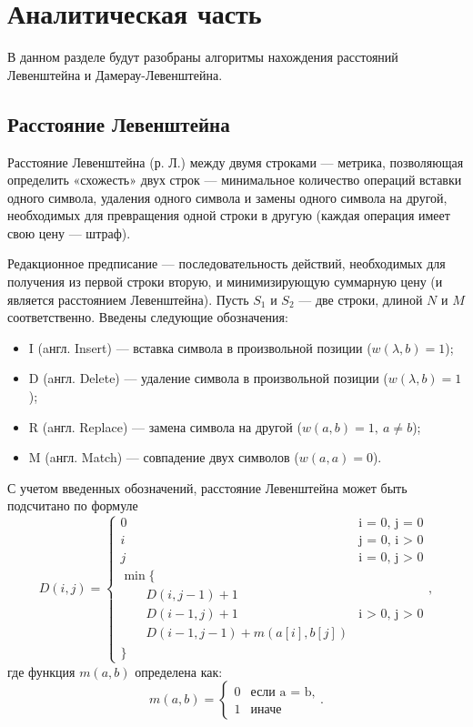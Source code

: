 \chapter{Аналитическая часть}

В данном разделе будут разобраны алгоритмы нахождения расстояний Левенштейна и Дамерау-Левенштейна.

\section{Расстояние Левенштейна}

Расстояние Левенштейна (р. Л.) между двумя строками --- метрика, позволяющая определить «схожесть» двух строк --- минимальное количество операций вставки одного символа, удаления одного символа и замены одного символа на другой, необходимых для превращения одной строки в другую (каждая операция имеет свою цену --- штраф). 

Редакционное предписание --- последовательность действий, необходимых для получения из первой строки вторую, и минимизирующую суммарную цену (и является расстоянием Левенштейна).
Пусть $S_{1}$ и $S_{2}$ --- две строки, длиной $N$ и $M$ соответственно. 
Введены следующие обозначения:
\begin{itemize}
	\item I (aнгл. Insert) --- вставка символа в произвольной позиции ($w(\lambda,b)=1$);
	\item D (aнгл. Delete) --- удаление символа в произвольной позиции ($w(\lambda,b)=1$);
	\item R (aнгл. Replace) --- замена символа на другой ($w(a,b)=1, \medspace a \neq b$);
	\item M (aнгл. Match) --- совпадение двух символов ($w(a,a)=0$).
\end{itemize}
С учетом введенных обозначений, расстояние Левенштейна может быть подсчитано по формуле
\begin{equation}
	\label{eq:D}
	D(i, j) = \begin{cases}
		0 &\text{i = 0, j = 0}\\
		i &\text{j = 0, i > 0}\\
		j &\text{i = 0, j > 0}\\
		\min \lbrace \\
		\qquad D(i, j-1) + 1\\
		\qquad D(i-1, j) + 1 &\text{i > 0, j > 0}\\
		\qquad D(i-1, j-1) + m(a[i], b[j]) \\
		\rbrace
	\end{cases},
\end{equation}
где функция $m(a, b)$ определена как:
\begin{equation}
	\label{eq:m}
	m(a, b) = \begin{cases}
		0 &\text{если a = b,}\\
		1 &\text{иначе}
	\end{cases}.
\end{equation}

